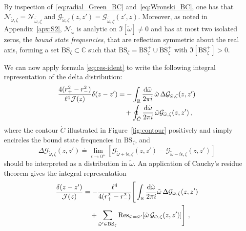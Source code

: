 \documentclass[aps, prd, amsmath, floats, floatfix, twocolumn, nofootinbib, superscriptaddress, showpacs]{revtex4-1}
\def\bC{{\mathbb C}}
\def\bR{{\mathbb R}}
\def\cG{\mathcal{G}}
\def\cJ{\mathcal{J}}
\def\Res{\operatorname{Res}}
\def\BS{\mathrm{BS}}
\def\tomega{{\tilde{\omega}}}
\begin{document}
By inspection of~\eqref{eq:radial_Green_BC} and~\eqref{eq:Wronski_BC}, 
one has that  $\overline{\mathcal{N}_{\tomega,\zeta}} =
\mathcal{N}_{\overline{\tomega},\zeta}$ and $\overline{\cG_{\tomega,\zeta}}(z,z') 
= \cG_{\overline{\tomega},\zeta}(z',z)$. 
Moreover, as noted in Appendix~\ref{apx:S2}, $\mathcal{N}_\tomega$ is 
analytic on $\Im[\tomega] \ne 0$ and has at most two isolated 
zeros, the \emph{bound state frequencies}, that are reflection symmetric about the real axis,
forming a set $\BS_\zeta \subset \bC$ such that
$\BS_\zeta = \BS_\zeta^+ \cup \overline{\BS_\zeta^+}$ with
$\Im[\BS_\zeta^+] > 0$.

We can now apply formula
\eqref{eq:res-ident} to write the following integral
representation of the delta distribution:
%
\begin{align}
\frac{4(r_+^2 - r_-^2)}{\ell^4 \cJ(z)} \delta(z-z')
& = -\int_{\bR} \frac{\dd\tilde{\omega}}{2\pi i} \,
\tilde{\omega} \,
\Delta \cG_{\tomega,\zeta}(z,z') \notag
\\
&\quad + \oint_{\mathring{C}} \frac{\dd\tomega}{2\pi i} \,
\tomega \mathcal{G}_{\tomega,\zeta}(z,z') \, ,
\end{align}
where the contour $\mathring{C}$ illustrated in Figure~\ref{fig:contour}
positively and simply encircles the bound state frequencies in $\BS_\zeta$,
and
\begin{equation}
\Delta \cG_{\tomega,\zeta}(z,z')
\doteq \lim_{\epsilon \to 0^+}
[\cG_{\tomega+i\epsilon,\zeta}(z,z') - \cG_{\tomega-i\epsilon,\zeta}(z,z')]
\end{equation}
should be interpreted as a distribution in $\tomega$.
%
An application of Cauchy's residue theorem
gives the integral representation
\begin{align}
\frac{\delta(z-z')}{\cJ(z)}
\notag
&= -\frac{\ell^4}{4(r_+^2-r_-^2)} \Bigg[ \int_\bR \frac{\dd\tomega}{2\pi i} \tomega \,
\Delta \cG_{\tomega,\zeta}(z,z') \\
& \quad
+ \sum_{\tomega'\in \BS_\zeta}
\Res_{\tomega=\tomega'}[ \tomega \, \cG_{\tomega,\zeta}(z,z')] \Bigg] \ ,
\label{eq:id-res}
\end{align}
\end{document}
